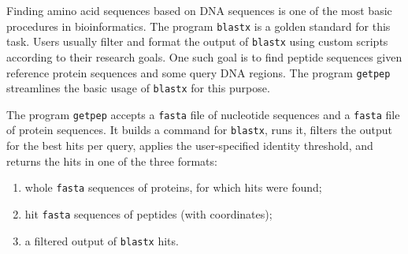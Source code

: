 Finding amino acid sequences based on DNA sequences is one of the most
basic procedures in bioinformatics. The program \texttt{blastx} is a
golden standard for this task. Users usually filter and format the
output of \texttt{blastx} using custom scripts according to their
research goals. One such goal is to find peptide sequences given
reference protein sequences and some query DNA regions. The
program \texttt{getpep} streamlines the basic usage of \texttt{blastx}
for this purpose.

The program \texttt{getpep} accepts a \texttt{fasta} file of
nucleotide sequences and a \texttt{fasta} file of protein
sequences. It builds a command for \texttt{blastx}, runs it, filters
the output for the best hits per query, applies the user-specified
identity threshold, and returns the hits in one of the three formats:

\begin{enumerate}
  \itemsep0em
  \item whole \texttt{fasta} sequences of proteins, for which hits were found;
  \item hit \texttt{fasta} sequences of peptides (with coordinates);
  \item a filtered output of \texttt{blastx} hits.
\end{enumerate}
